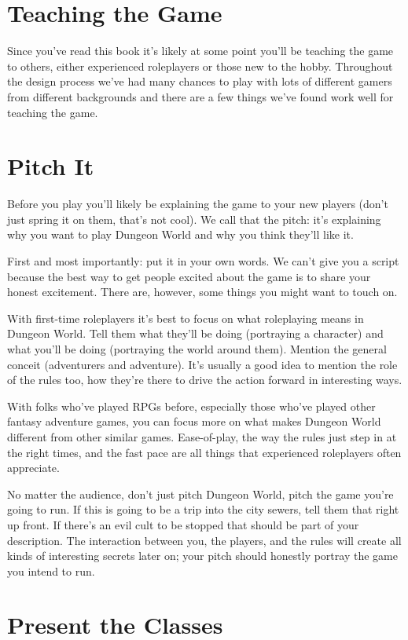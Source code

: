 \section{Teaching the Game}


 Since you've read this book it's likely at some point you'll be teaching the game to others, either experienced roleplayers or those new to the hobby. Throughout the design process we've had many chances to play with lots of different gamers from different backgrounds and there are a few things we've found work well for teaching the game.
\section*{Pitch It}


 Before you play you'll likely be explaining the game to your new players (don't just spring it on them, that's not cool). We call that the pitch: it's explaining why you want to play Dungeon World and why you think they'll like it.


 First and most importantly: put it in your own words. We can't give you a script because the best way to get people excited about the game is to share your honest excitement. There are, however, some things you might want to touch on.


 With first-time roleplayers it's best to focus on what roleplaying means in Dungeon World. Tell them what they'll be doing (portraying a character) and what you'll be doing (portraying the world around them). Mention the general conceit (adventurers and adventure). It's usually a good idea to mention the role of the rules too, how they're there to drive the action forward in interesting ways.


 With folks who've played RPGs before, especially those who've played other fantasy adventure games, you can focus more on what makes Dungeon World different from other similar games. Ease-of-play, the way the rules just step in at the right times, and the fast pace are all things that experienced roleplayers often appreciate.


 No matter the audience, don't just pitch Dungeon World, pitch the game you're going to run. If this is going to be a trip into the city sewers, tell them that right up front. If there's an evil cult to be stopped that should be part of your description. The interaction between you, the players, and the rules will create all kinds of interesting secrets later on; your pitch should honestly portray the game you intend to run.
\section*{Present the Classes}


